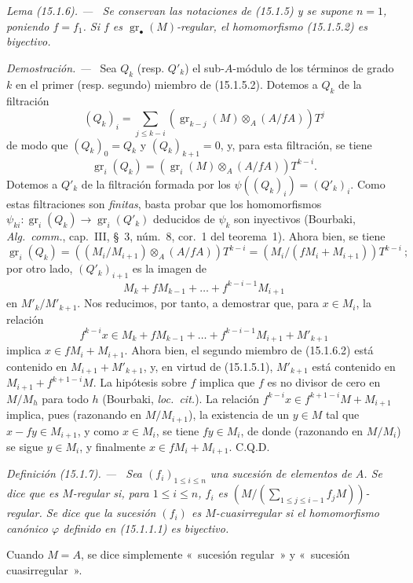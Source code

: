 \documentclass[10pt,oneside]{book}
\makeatletter
\newcommand{\gr}{\operatorname{gr}}
\newcommand{\setmanualcurrentlabel}[1]{\def\@currentlabel{#1}}
\newcommand{\oldpage}[2][]{%
  \setcounter{footnote}{0}%
  \marginpar{\scriptsize\textbf{#1}~|~#2}\ignorespaces}
\newenvironment{definition}[1][]{%
  \setmanualcurrentlabel{#1}\par\medskip\noindent\itshape Definición (#1). ---\ }{\par}
\newenvironment{lemma}[1][]{%
  \setmanualcurrentlabel{#1}\par\medskip\noindent\itshape Lema (#1). ---\ }{\par}
\newenvironment{proof}{%
  \par\medskip\noindent\textit{Demostración. ---\ }}{\par}
\makeatother
\begin{document}
\begin{lemma}[15.1.6]
\label{0.15.1.6-es}
Se conservan las notaciones de (15.1.5) y se supone $n=1$, poniendo $f=f_1$.
Si $f$ es $\gr_\bullet(M)$-regular, el homomorfismo (15.1.5.2) es biyectivo.
\end{lemma}

\begin{proof}
Sea $Q_k$ (resp. $Q'_k$) el sub-$A$-módulo de los términos de grado $k$ en
el primer (resp. segundo) miembro de (15.1.5.2). Dotemos a $Q_k$ de la filtración
\[
  (Q_k)_i=\sum_{j\leq k-i}
  (\gr_{k-j}(M)\otimes_A(A/fA))T^j
  \tag{15.1.6.1}\label{0.15.1.6.1-es}
\]
de modo que $(Q_k)_0=Q_k$ y $(Q_k)_{k+1}=0$, y, para esta filtración, se tiene
\[
  \gr_i(Q_k)=(\gr_i(M)\otimes_A(A/fA))T^{k-i}.
\]
Dotemos a $Q'_k$ de la filtración formada por los
$\psi((Q_k)_i)=(Q'_k)_i$. Como estas filtraciones son \emph{finitas}, basta
probar que los homomorfismos $\psi_{ki}:\gr_i(Q_k)\to\gr_i(Q'_k)$ deducidos de
$\psi_k$ son inyectivos (Bourbaki, \emph{Alg.~comm.}, cap.~III, \S~3,
núm.~8, cor.~1 del teorema~1). Ahora bien, se tiene
\[
  \gr_i(Q_k)=((M_i/M_{i+1})\otimes_A(A/fA))T^{k-i}=(M_i/(fM_i+M_{i+1}))T^{k-i}~;
\]
por otro lado, $(Q'_k)_{i+1}$ es la imagen de
\[
  M_k+fM_{k-1}+\ldots+f^{k-i-1}M_{i+1}
\]
\oldpage[0\textsubscript{IV-1}]{15}
en $M'_k/M'_{k+1}$. Nos reducimos, por tanto, a demostrar que, para $x\in M_i$,
la relación
\[
  f^{k-i}x\in M_k+fM_{k-1}+\ldots+
  f^{k-i-1}M_{i+1}+M'_{k+1}
  \tag{15.1.6.2}\label{0.15.1.6.2-es}
\]
implica $x\in fM_i+M_{i+1}$. Ahora bien, el segundo miembro de (15.1.6.2) está
contenido en $M_{i+1}+M'_{k+1}$, y, en virtud de (15.1.5.1), $M'_{k+1}$ está
contenido en $M_{i+1}+f^{k+1-i}M$. La hipótesis sobre $f$ implica que $f$ es
no divisor de cero en $M/M_h$ para todo $h$ (Bourbaki, \emph{loc.~cit.}). La
relación $f^{k-i}x\in f^{k+1-i}M+M_{i+1}$ implica, pues (razonando en
$M/M_{i+1}$), la existencia de un $y\in M$ tal que $x-fy\in M_{i+1}$, y como
$x\in M_i$, se tiene $fy\in M_i$, de donde (razonando en $M/M_i$) se sigue
$y\in M_i$, y finalmente $x\in fM_i+M_{i+1}$. C.Q.D.
\end{proof}

\begin{definition}[15.1.7]
\label{0.15.1.7-es}
Sea $(f_i)_{1\leq i\leq n}$ una sucesión de elementos de $A$. Se dice que es
$M$-regular si, para $1\leq i\leq n$, $f_i$ es
$\left(M/(\sum_{1\leq j\leq i-1}f_jM)\right)$-regular. Se dice que la sucesión
$(f_i)$ es $M$-cuasirregular si el homomorfismo canónico $\varphi$
definido en (15.1.1.1) es biyectivo.

Cuando $M=A$, se dice simplemente «~sucesión regular~» y
«~sucesión cuasirregular~».
\end{definition}
\end{document}
